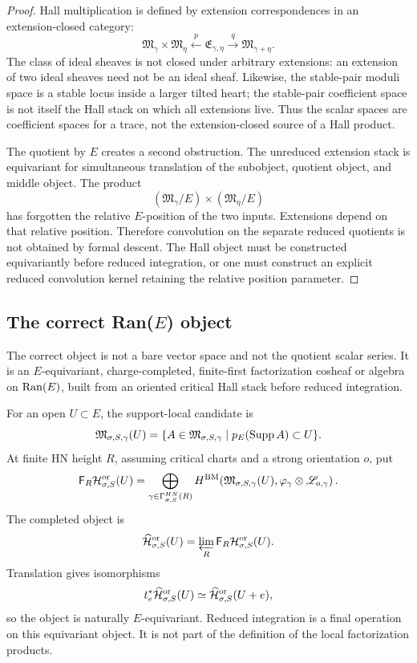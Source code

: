 \begin{proof}
Hall multiplication is defined by extension correspondences in an
extension-closed category:
\[
\mathfrak M_\gamma\times\mathfrak M_\eta
\xleftarrow{\ p\ }
\mathfrak E_{\gamma,\eta}
\xrightarrow{\ q\ }
\mathfrak M_{\gamma+\eta}.
\]
The class of ideal sheaves is not closed under arbitrary extensions:
an extension of two ideal sheaves need not be an ideal sheaf.  Likewise,
the stable-pair moduli space is a stable locus inside a larger tilted
heart; the stable-pair coefficient space is not itself the Hall stack on
which all extensions live.  Thus the scalar spaces are coefficient
spaces for a trace, not the extension-closed source of a Hall product.

The quotient by \(E\) creates a second obstruction.  The unreduced
extension stack is equivariant for simultaneous translation of the
subobject, quotient object, and middle object.  The product
\[
(\mathfrak M_\gamma/E)\times(\mathfrak M_\eta/E)
\]
has forgotten the relative \(E\)-position of the two inputs.  Extensions
depend on that relative position.  Therefore convolution on the separate
reduced quotients is not obtained by formal descent.  The Hall object
must be constructed equivariantly before reduced integration, or one must
construct an explicit reduced convolution kernel retaining the relative
position parameter.
\end{proof}

\subsection{The correct Ran(\(E\)) object}

The correct object is not a bare vector space and not the quotient scalar
series.  It is an \(E\)-equivariant, charge-completed, finite-first
factorization cosheaf or algebra on \(\operatorname{Ran}(E)\), built from an oriented
critical Hall stack before reduced integration.

For an open \(U\subset E\), the support-local candidate is
\[
\mathfrak M_{\sigma,S,\gamma}(U)
=
\{A\in\mathfrak M_{\sigma,S,\gamma}\mid
p_E(\operatorname{Supp} A)\subset U\}.
\]
At finite HN height \(R\), assuming critical charts and a strong
orientation \(o\), put
\[
\mathsf F_R\mathcal H^{\mathrm{or}}_{\sigma,S}(U)
=
\bigoplus_{\gamma\in\Gamma_{\sigma,S}^{HN}(R)}
H^{\operatorname{BM}}\!\left(
\mathfrak M_{\sigma,S,\gamma}(U),
\varphi_\gamma\otimes\mathscr L_{o,\gamma}
\right).
\]
The completed object is
\[
\widehat{\mathcal H}^{\mathrm{or}}_{\sigma,S}(U)
=
\varprojlim_R \mathsf F_R\mathcal H^{\mathrm{or}}_{\sigma,S}(U).
\]
Translation gives isomorphisms
\[
t_e^*\widehat{\mathcal H}^{\mathrm{or}}_{\sigma,S}(U)
\simeq
\widehat{\mathcal H}^{\mathrm{or}}_{\sigma,S}(U+e),
\]
so the object is naturally \(E\)-equivariant.  Reduced integration is a
final operation on this equivariant object.  It is not part of the
definition of the local factorization products.

